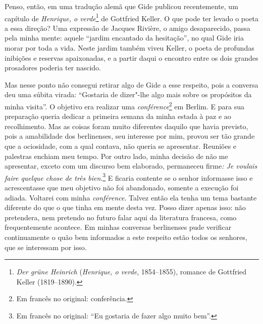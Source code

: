 Penso, então, em uma tradução alemã que Gide publicou recentemente, um
capítulo de \emph{Henrique, o verde}\footnote{\emph{Der grüne
  Heinrich} (\emph{Henrique, o verde}, 1854--1855), romance de Gottfried Keller
  (1819--1890). \versal{[N.~O.]}} de Gottfried Keller. O que pode ter levado o poeta a
essa direção? Uma expressão de Jacques Rivière, o amigo desaparecido,
passa pela minha mente: aquele ``jardim encantado da hesitação'', no
qual Gide iria morar por toda a vida. Neste jardim também viveu Keller,
o poeta de profundas inibições e reservas apaixonadas, e a partir daqui
o encontro entre os dois grandes prosadores poderia ter nascido.

Mas nesse ponto não consegui retirar algo de Gide a esse
respeito, pois a conversa deu uma súbita virada: ``Gostaria de dizer"-lhe
algo mais sobre os propósitos da minha visita''. O objetivo era realizar
uma \emph{conférence}\footnote{Em francês no original: conferência. \versal{[N.~T.]}} em Berlim. E para sua preparação queria dedicar a
primeira semana da minha estada à paz e ao recolhimento. Mas as
coisas foram muito diferentes daquilo que havia previsto, pois a
amabilidade dos berlinenses, seu interesse por mim, provou ser tão
grande que a ociosidade, com a qual contava, não queria se apresentar.
Reuniões e palestras enchiam meu tempo. Por
outro lado, minha decisão de não me apresentar, exceto com um discurso
bem elaborado, permaneceu firme\emph{: Je voulais faire quelque chose de
très bien}.\footnote{Em francês no original: ``Eu gostaria de fazer algo muito bem''. \versal{[N.~T.]}}
E ficaria contente se o senhor informasse isso e acrescentasse que
meu objetivo não foi abandonado, somente a execução foi adiada. Voltarei com minha \emph{conférence}.
Talvez então ela tenha um tema bastante diferente do que o que tinha em
mente desta vez. Posso dizer apenas isso: não pretendera, nem pretendo
no futuro falar aqui da literatura francesa, como frequentemente
acontece. Em minhas conversas berlinenses pude verificar continuamente
o quão bem informados a este respeito estão todos os senhores, que se
interessam por isso.

